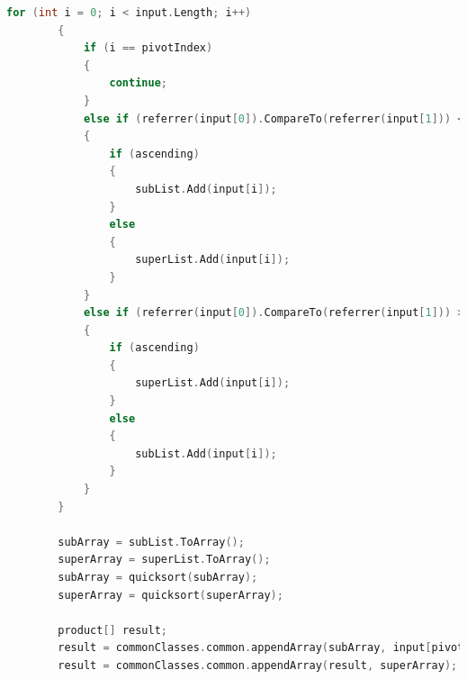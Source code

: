 ﻿\documentclass{article}
\begin{document}
\begin{enumerate}
\begin{lstlisting}[language=C]
        for (int i = 0; i < input.Length; i++)
        {
            if (i == pivotIndex)
            {
                continue;
            }
            else if (referrer(input[0]).CompareTo(referrer(input[1])) < 0)
            {
                if (ascending)
                {
                    subList.Add(input[i]);
                }
                else
                {
                    superList.Add(input[i]);
                }
            }
            else if (referrer(input[0]).CompareTo(referrer(input[1])) > 0)
            {
                if (ascending)
                {
                    superList.Add(input[i]);
                }
                else
                {
                    subList.Add(input[i]);
                }
            }
        }

        subArray = subList.ToArray();
        superArray = superList.ToArray();
        subArray = quicksort(subArray);
        superArray = quicksort(superArray);

        product[] result;
        result = commonClasses.common.appendArray(subArray, input[pivotIndex]);
        result = commonClasses.common.appendArray(result, superArray);


\end{lstlisting}
\end{enumerate}
\end{document}
